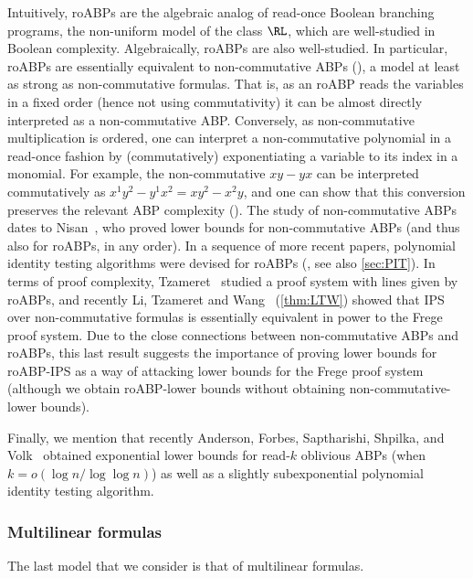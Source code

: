 \documentclass[11pt]{article}
\numberwithin{equation}{section}
\theoremstyle{definition}
\theoremstyle{plain}
\begin{document}
Intuitively, roABPs are the algebraic analog of read-once Boolean branching programs, the non-uniform model of the class $\RL$, which are well-studied in Boolean complexity.  Algebraically, roABPs are also well-studied. In particular, roABPs are essentially equivalent to non-commutative ABPs (\cite{ForbesShpilka13b}), a model at least as strong as non-commutative formulas.  That is, as an roABP reads the variables in a fixed order (hence not using commutativity) it can be almost directly interpreted as a non-commutative ABP\@. Conversely, as non-commutative multiplication is ordered, one can interpret a non-commutative polynomial in a read-once fashion by (commutatively) exponentiating a variable to its index in a monomial.  For example, the non-commutative $xy-yx$ can be interpreted commutatively as $x^1y^2-y^1x^2=xy^2-x^2y$, and one can show that this conversion preserves the relevant ABP complexity (\cite{ForbesShpilka13b}). The study of non-commutative ABPs dates to Nisan~\cite{Nisan91}, who proved lower bounds for non-commutative ABPs (and thus also for roABPs, in any order). In a sequence of more recent papers, polynomial identity testing algorithms were devised for roABPs (\cite{RazShpilka05,ForbesShpilka12,ForbesShpilka13b,ForbesSS14,AgrawalGKS15}, see also \autoref{sec:PIT}). In terms of proof complexity, Tzameret~\cite{Tzameret11} studied a proof system with lines given by roABPs, and recently Li, Tzameret and Wang~\cite{LiTW15} (\autoref{thm:LTW}) showed that IPS over non-commutative formulas is essentially equivalent in power to the Frege proof system.  Due to the close connections between non-commutative ABPs and roABPs, this last result suggests the importance of proving lower bounds for roABP-IPS as a way of attacking lower bounds for the Frege proof system (although
%
we obtain  %
roABP-\lIPS lower bounds without obtaining non-commutative-\lIPS lower bounds).

Finally, we mention that recently Anderson, Forbes, Saptharishi, Shpilka, and Volk~\cite{AndersonFSSV16} obtained exponential lower bounds for read-$k$ oblivious ABPs (when $k=o(\log n/\log\log n)$) as well as a slightly subexponential polynomial identity testing algorithm.

%

\subsubsection{Multilinear formulas}

The last model that we consider is that of multilinear formulas.
\end{document}
